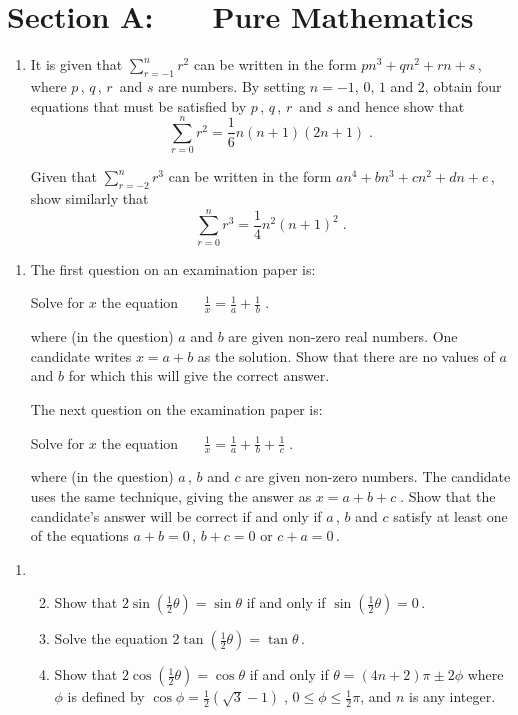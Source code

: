 \documentclass[a4, 11pt]{report}
\newlength{\qspace}
\newcounter{qnumber}
\newenvironment{question}%
 {\vspace{\qspace}
  \begin{enumerate}[\bfseries 1\quad][10]%
    \setcounter{enumi}{\value{qnumber}}%
    \item%
 }
{
  \end{enumerate}
  \filbreak
  \stepcounter{qnumber}
 }
\newenvironment{questionparts}[1][1]%
 {
  \begin{enumerate}[\bfseries (i)]%
    \setcounter{enumii}{#1}
    \addtocounter{enumii}{-1}
    \setlength{\itemsep}{5mm}
    \setlength{\parskip}{8pt}
 }
 {
  \end{enumerate}
 }
\def\le{\leqslant}
\newcommand{\ds}{\displaystyle}
\newcommand{\ts}{\textstyle}
\def\half{{\textstyle \frac12}}
\begin{document}
\setcounter{page}{2}

 
\section*{Section A: \ \ \ Pure Mathematics}

\begin{question}
It is given that $\sum\limits_{r=-1}^ {n} r^2$  can be written  in the form 
$pn^3 +qn^2+rn+s\,$, where $p\,$, $q\,$, $r\,$ and $s$ are numbers. By setting $n=-1$, $0$, $1$  and $2$,
obtain four  equations that must be satisfied by $p\,$, $q\,$, $r\,$ and $s$ 
and hence show that
\[
{\ts \sum\limits_{r=0} ^n} r^2= {\textstyle \frac16} n(n+1)(2n+1)\;.
\]

Given that $\sum\limits_{r=-2}^ nr^3$  can be written  in the form 
$an^4 +bn^3+cn^2+dn +e\,$,
show similarly that
\[
{\ts \sum\limits_{r=0} ^n} r^3= {\textstyle \frac14} n^2(n+1)^2\;.
\]
\end{question}

\begin{question}
The first question on an examination paper is:

\hspace*{3cm}
Solve for $x$ the equation \ \ \
$\ds
\frac 1x = \frac 1 a + \frac 1b \;.
$

\noindent
where (in the question) $a$ and $b$ are given non-zero real numbers.
One candidate writes $x=a+b$ as the solution. Show that there
are no values of $a$ and $b$ for which this will give the correct answer.

The  next question on the  examination paper is:

\hspace*{3cm}
Solve for $x$ the equation \ \ \ 
$\ds
\frac 1x = \frac 1 a + \frac 1b  +\frac 1c \;.
$

\noindent
where (in the question) $a\,$, $b$ and $c$  are given non-zero numbers.
The  candidate uses the same technique, giving the answer as
$\ds
x = a + b  +c \;.
$
Show that the candidate's
answer will be correct if and only if  $a\,$, $b$ and $c$
satisfy at least one of the equations
$a+b=0\,$, $b+c=0$ or $c+a=0\,$.
\end{question}

\begin{question}
\begin{questionparts}
\item
 Show that  $ 2\sin(\half\theta)=\sin \theta$ 
if and only if $\sin(\half\theta)=0\,$. 

\item Solve the equation $2\tan (\half\theta) = \tan\theta\,$.
 
\item
Show that $2\cos(\half \theta)=\cos \theta$ 
if and only if $\theta=(4n+2)\pi\pm 2\phi$ where $\phi$ is 
defined by
$\cos \phi=\half(\sqrt 3-1)\;$, $0\le \phi\le \frac{1}{2}\pi$, and 
$n$ is any integer. 
\end{questionparts}
\end{question}
\end{document}

